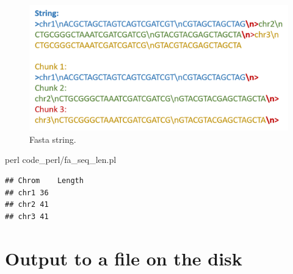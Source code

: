 \documentclass[]{book}
\makeatletter
\newenvironment{Shaded}{\begin{snugshade}}{\end{snugshade}}
\newcommand{\FunctionTok}[1]{\textcolor[rgb]{0.00,0.00,0.00}{#1}}
\newcommand{\NormalTok}[1]{#1}
\newenvironment{kframe}{%
\medskip{}
\setlength{\fboxsep}{.8em}
 \def\at@end@of@kframe{}%
 \ifinner\ifhmode%
  \def\at@end@of@kframe{\end{minipage}}%
  \begin{minipage}{\columnwidth}%
 \fi\fi%
 \def\FrameCommand##1{\hskip\@totalleftmargin \hskip-\fboxsep
 \colorbox{shadecolor}{##1}\hskip-\fboxsep
     \hskip-\linewidth \hskip-\@totalleftmargin \hskip\columnwidth}%
 \MakeFramed {\advance\hsize-\width
   \@totalleftmargin\z@ \linewidth\hsize
   \@setminipage}}%
 {\par\unskip\endMakeFramed%
 \at@end@of@kframe}
\renewenvironment{Shaded}{\begin{kframe}}{\end{kframe}}
\makeatother
\begin{document}
\begin{figure}
\centering
\includegraphics{figures/fasta_string.png}
\caption{\label{fig:fastaString}Fasta string.}
\end{figure}

\begin{Shaded}
\begin{Highlighting}[]
\FunctionTok{perl}\NormalTok{ code_perl/fa_seq_len.pl}
\end{Highlighting}
\end{Shaded}

\begin{verbatim}
## Chrom    Length
## chr1 36
## chr2 41
## chr3 41
\end{verbatim}

\hypertarget{output-to-a-file-on-the-disk}{%
\section{Output to a file on the disk}\label{output-to-a-file-on-the-disk}}
\end{document}
